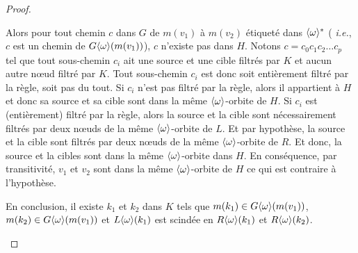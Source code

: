 \begin{proof}
\begin{enumerate}
		      Alors pour tout chemin $c$ dans $G$ de $m(v_1)$
		      à $m(v_2)$ étiqueté dans $\langle\omega\rangle^*$ ( \textit{i.e.}, $c$ est un
		      chemin de $G\langle\omega\rangle(m(v_1))$), $c$ n'existe pas dans $H$. %
		      Notons $c = c_0 c_1 c_2 \ldots c_p$ tel que tout sous-chemin $c_i$ ait une source et une cible filtrés par $K$ et aucun autre n\oe ud filtré par $K$. %
		      Tout sous-chemin $c_i$ est donc soit entièrement filtré par la règle, soit pas du tout. %
		      Si $c_i$ n'est pas filtré par la règle, alors il appartient à $H$ et donc sa source et sa cible sont dans la même $\langle\omega\rangle$-orbite de $H$. %
		      Si $c_i$ est (entièrement) filtré par la règle, alors la source et la cible sont nécessairement filtrés par deux n\oe uds de la même $\langle\omega\rangle$-orbite de $L$. %
		      Et par hypothèse, la source et la cible sont filtrés par deux n\oe uds de la même $\langle\omega\rangle$-orbite de $R$. %
		      Et donc, la source et la cibles sont dans la même $\langle\omega\rangle$-orbite dans $H$. %
		      En conséquence, par transitivité, $v_1$ et $v_2$ sont dans la même $\langle\omega\rangle$-orbite de $H$ ce qui est contraire à l'hypothèse. %

		      En conclusion, il existe $k_1$ et $k_2$ dans $K$ tels que $m(k_1) \in G\langle\omega\rangle(m(v_1))$, $m(k_2) \in G\langle\omega\rangle(m(v_1))$ et $L\langle\omega\rangle(k_1)$ est scindée en $R\langle\omega\rangle(k_1)$ et $R\langle\omega\rangle(k_2)$. %







	\end{enumerate}
\end{proof}

